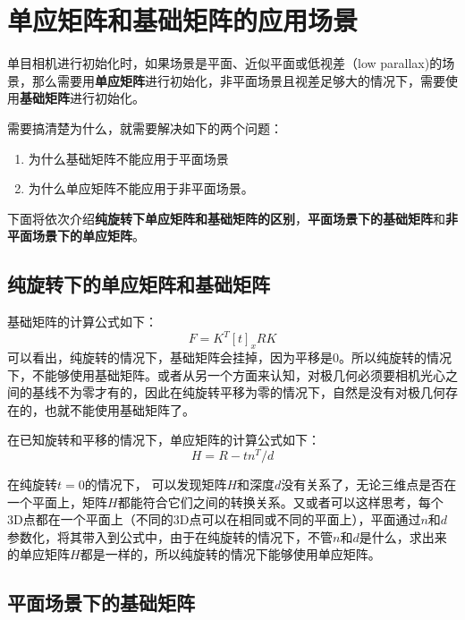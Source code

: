\section{单应矩阵和基础矩阵的应用场景}

单目相机进行初始化时，如果场景是平面、近似平面或低视差（low parallax)的场景，那么需要用\textbf{单应矩阵}进行初始化，非平面场景且视差足够大的情况下，需要使用\textbf{基础矩阵}进行初始化。

需要搞清楚为什么，就需要解决如下的两个问题：
\begin{enumerate}
	\item 为什么基础矩阵不能应用于平面场景
	\item 为什么单应矩阵不能应用于非平面场景。
\end{enumerate}


下面将依次介绍\textbf{纯旋转下单应矩阵和基础矩阵的区别}，\textbf{平面场景下的基础矩阵}和\textbf{非平面场景下的单应矩阵}。

\subsection{纯旋转下的单应矩阵和基础矩阵}

基础矩阵的计算公式如下：
\begin{equation}
	F = K^T[t]_x RK
\end{equation}
可以看出，纯旋转的情况下，基础矩阵会挂掉，因为平移是0。所以纯旋转的情况下，不能够使用基础矩阵。或者从另一个方面来认知，对极几何必须要相机光心之间的基线不为零才有的，因此在纯旋转平移为零的情况下，自然是没有对极几何存在的，也就不能使用基础矩阵了。



在已知旋转和平移的情况下，单应矩阵的计算公式如下：
\begin{equation}
	H = R - tn^T/d
\end{equation}


在纯旋转$t = 0$的情况下， 可以发现矩阵$H$和深度$d$没有关系了，无论三维点是否在一个平面上，矩阵$H$都能符合它们之间的转换关系。又或者可以这样思考，每个3D点都在一个平面上（不同的3D点可以在相同或不同的平面上），平面通过$n$和$d$参数化，将其带入到公式中，由于在纯旋转的情况下，不管$n$和$d$是什么，求出来的单应矩阵$H$都是一样的，所以纯旋转的情况下能够使用单应矩阵。





\subsection{平面场景下的基础矩阵}


